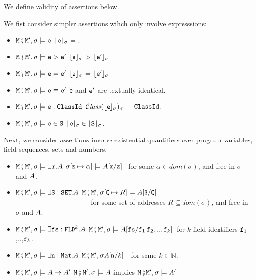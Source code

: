 \begin{definition} We define validity of assertions below.
\label{def:valid:assertion}

We fist consider simpler assertions wihch only involve expresssions:

\begin{itemize}
\item
$\M\mkpair \M', \sigma \models\SE$ \IFF  $\interp{\SE}{\sigma}$ = .
\item
$\M\mkpair \M', \sigma \models\SE>\SEPrime$ \IFF $\interp{\SE}{\sigma}$ > $\interp{\SEPrime}{\sigma}$.
\item
$\M\mkpair \M', \sigma \models\SE=\SEPrime$ \IFF $\interp{\SE}{\sigma}$ = $\interp{\SEPrime}{\sigma}$.
\item
$\M\mkpair \M', \sigma \models\SE\equiv\SEPrime$ \IFF $\SE$ and $\SEPrime$ are textually identical.
\item
$\M\mkpair \M', \sigma \models \SE:\prg{ClassId}$ \IFF $\ClassOf {\interp{\SE}{\sigma}} {\sigma}$ = $\prg{ClassId}$.
\item
$\M\mkpair \M', \sigma \models \SE\in \prg{S}$ \IFF $\interp{\SE}{\sigma}\in \interp{\prg{S}}{\sigma}$.
\end{itemize}

Next, we consider assertions involve existential quantifiers over program variables, field sequences, sets and numbers.

\begin{itemize}
\item
$\M\mkpair \M', \sigma \models \exists x.\A$ \IFF  
$\sigma[\prg{z}\mapsto \alpha] \models  \A[\prg{x}/\prg{z}]$ \ for some  $\alpha\in dom(\sigma)$, and    free in $\sigma$ and $\A$.\item
$\M\mkpair \M', \sigma \models \exists \prg{S}:\prg{SET}.\A$ \IFF  $\M\mkpair \M', \sigma[\prg{Q}\mapsto R] \models  \A[\prg{S}/\prg{Q}]$ \\
$\strut ~ \hspace{1.4in} $ for some set of addresses $R\subseteq dom(\sigma)$, and    free in $\sigma$ and $\A$.
 
\item
$\M\mkpair \M', \sigma \models  \exists \prg{fs}:\prg{FLD}^k.\A$ \IFF  
$\M\mkpair \M', \sigma \models  \A[\prg{fs}/\prg{f}_1.\f_2.\,...\,\prg{f}_k]$\  for  $k$ field identifiers $\prg{f}_1$,..,$\prg{f}_k$.
\item
$\M\mkpair \M', \sigma \models  \exists \prg{n}:\prg{Nat}.\A$ \IFF  $\M\mkpair \M', \sigma \A[\prg{n}/k]$\ \ for some $k\in\mathbb{N}$.
\item
$\M\mkpair \M', \sigma \models \A \rightarrow \A' $ \IFF  $\M\mkpair \M', \sigma \models \A $ implies $\M\mkpair \M', \sigma \models \A' $
\end{itemize}


\end{definition}
